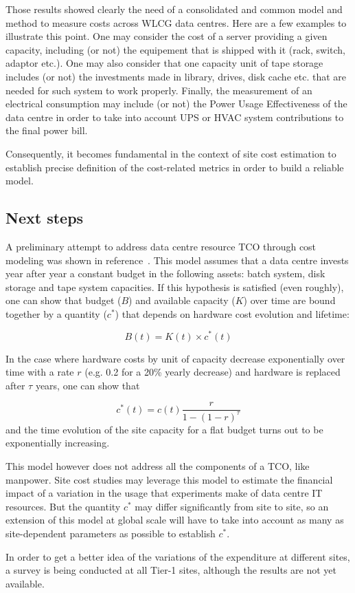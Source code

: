 Those results showed clearly the need of a consolidated and common
model and method to measure costs across WLCG data centres.  Here are
a few examples to illustrate this point. One may consider the cost of
a server providing a given capacity, including (or not) the equipement
that is shipped with it (rack, switch, adaptor etc.).  One may also
consider that one capacity unit of tape storage includes (or not) the
investments made in library, drives, disk cache etc.  that are needed
for such system to work properly.  Finally, the measurement of an
electrical consumption may include (or not) the Power Usage
Effectiveness of the data centre in order to take into account UPS or
HVAC system contributions to the final power bill.

Consequently, it becomes fundamental in the context of site cost
estimation to establish precise definition of the cost-related metrics
in order to build a reliable model.

\subsection{Next steps}

A preliminary attempt to address data centre resource TCO through cost
modeling was shown in reference~\cite{costmodel}.  This model assumes
that a data centre invests year after year a constant budget in the
following assets: batch system, disk storage and tape system
capacities.  If this hypothesis is satisfied (even roughly), one can
show that budget ($B$) and available capacity ($K$) over time are
bound together by a quantity ($c^*$) that depends on hardware cost
evolution and lifetime:

\begin{equation}
    B (t) = K (t) \times c^* (t)
    \label{eq:costmodel}
\end{equation}

In the case where hardware costs by unit of capacity decrease
exponentially over time with a rate $r$ (e.g. 0.2 for a 20\% yearly
decrease) and hardware is replaced after $\tau$ years, one can show
that

\begin{equation}
c^*(t)=c(t)\frac{r}{1-(1-r)^\tau}
\end{equation}
and the time evolution of the site capacity for a flat budget turns
out to be exponentially increasing.

This model however does not address all the components of a TCO, like
manpower.  Site cost studies may leverage this model to estimate the
financial impact of a variation in the usage that experiments make of
data centre IT resources.  But the quantity $c^*$ may differ
significantly from site to site, so an extension of this model at
global scale will have to take into account as many as site-dependent
parameters as possible to establish $c^*$.

In order to get a better idea of the variations of the expenditure at
different sites, a survey is being conducted at all Tier-1 sites,
although the results are not yet available.
